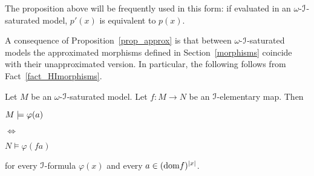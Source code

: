 \documentclass[10pt,oneside]{amsproc}
\begin{document}

\def\ceq#1#2#3{\parbox[t]{20ex}{$\displaystyle #1$}\parbox{5ex}{\hfil $#2$}{$\displaystyle #3$}}

\begin{remark}\label{remk_p'p}
  The proposition above will be frequently used in this form: if evaluated in an $\omega$-${\EuScript I}$-saturated model, $p'(x)$ is equivalent to $p(x)$.
\end{remark}

A consequence of Proposition~\ref{prop_approx} is that between $\omega$-${\EuScript I}$-saturated models the approximated morphisms defined in Section~\ref{morphisms} coincide with their unapproximated version.
In particular, the following follows from Fact~\ref{fact_HImorphisms}.

\begin{corollary}\label{corol_omega_sat}
  Let $M$ be an $\omega$-${\EuScript I}$-saturated model.
  Let $f:M\to N$ be an ${\EuScript I}$-elementary map.
  Then

  \ceq{\hfill M\models\varphi(a)}{\Leftrightarrow}{N\models\varphi(fa)}

  for every ${\EuScript I}$-formula $\varphi(x)$ and every $a\in({\rm dom }f)^{|x|}$.
\end{corollary}  





  
\end{document}
